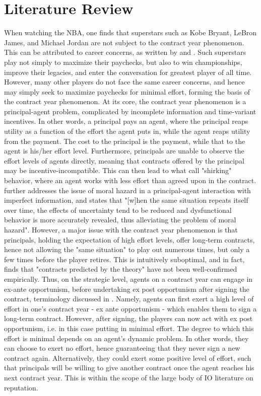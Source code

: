 \documentclass[12pt]{article}
\begin{document}
	\section{Literature Review} \label{sec:literature}
	When watching the NBA, one finds that superstars such as Kobe Bryant, LeBron James, and Michael Jordan are not subject to the contract year phenomenon. This can be attributed to career concerns, as written by \cite{holmstrom_contracts_1999} and \cite{gibbons_1992}. Such superstars play not simply to maximize their paychecks, but also to win championships, improve their legacies, and enter the conversation for greatest player of all time. However, many other players do not face the same career concerns, and hence may simply seek to maximize paychecks for minimal effort, forming the basis of the contract year phenomenon.
	At its core, the contract year phenomenon is a principal-agent problem, complicated by incomplete information and time-variant incentives. In other words, a principal pays an agent, where the principal reaps utility as a function of the effort the agent puts in, while the agent reaps utility from the payment. The cost to the principal is the payment, while that to the agent is his/her effort level. Furthermore, principals are unable to observe the effort levels of agents directly, meaning that contracts offered by the principal may be incentive-incompatible. This can then lead to what \cite{alchian_1972} call "shirking" behavior, where an agent works with less effort than agreed upon in the contract. \cite{holmstrom_contracts_1999} further addresses the issue of moral hazard in a principal-agent interaction with imperfect information, and states that "[w]hen the same situation repeats itself over time, the effects of uncertainty tend to be reduced and dysfunctional behavior is more accurately revealed, thus alleviating the problem of moral hazard". However, a major issue with the contract year phenomenon is that principals, holding the expectation of high effort levels, offer long-term contracts, hence not allowing the "same situation" to play out numerous times, but only a few times before the player retires. This is intuitively suboptimal, and in fact, \cite{prendergast_1999} finds that "contracts predicted by the theory" have not been well-confirmed empirically. Thus, on the strategic level, agents on a contract year can engage in ex-ante opportunism, before undertaking ex post opportunism after signing the contract, terminology discussed in \cite{ress_1994}. Namely, agents can first exert a high level of effort in one's contract year - ex ante opportunism - which enables them to sign a long-term contract. However, after signing, the players can now act with ex post opportunism, i.e. in this case putting in minimal effort. The degree to which this effort is minimal depends on an agent's dynamic problem. In other words, they can choose to exert no effort, hence guaranteeing that they never sign a new contract again. Alternatively, they could exert some positive level of effort, such that principals will be willing to give another contract once the agent reaches his next contract year. This is within the scope of the large body of IO literature on reputation.
	
\end{document}
